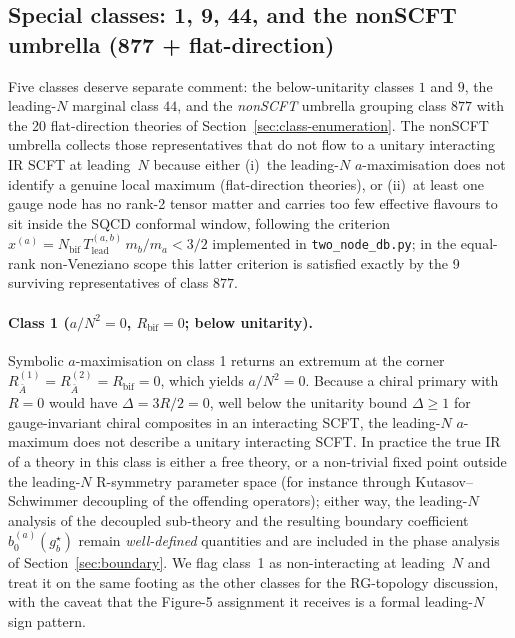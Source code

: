 \subsection{Special classes: 1, 9, 44, and the nonSCFT umbrella (877 + flat-direction)}
\label{sec:class-special}

Five classes deserve separate comment: the below-unitarity classes
$1$ and $9$, the leading-$N$ marginal class $44$, and the
\emph{nonSCFT} umbrella grouping class $877$ with the 20 flat-direction
theories of Section~\ref{sec:class-enumeration}.  The nonSCFT umbrella
collects those representatives that do not flow to a unitary
interacting IR SCFT at leading~$N$ because either (i)~the
leading-$N$ $a$-maximisation does not identify a genuine local
maximum (flat-direction theories), or (ii)~at least one gauge node
has no rank-2 tensor matter and carries too few effective flavours to
sit inside the SQCD conformal window, following the criterion
$x^{(a)}=N_{\text{bif}}\,T_{\text{lead}}^{(a,b)}\,m_{b}/m_{a}<3/2$
implemented in \texttt{two\_node\_db.py}; in the equal-rank
non-Veneziano scope this latter criterion is satisfied exactly by
the 9 surviving representatives of class $877$.

\paragraph{Class 1 ($a/N^{2}=0$, $R_{\text{bif}}=0$; below unitarity).}
Symbolic $a$-maximisation on class 1 returns an extremum at the
corner $R_{\bar A}^{(1)}=R_{\bar A}^{(2)}=R_{\text{bif}}=0$, which
yields $a/N^{2}=0$.  Because a chiral primary with $R=0$ would have
$\Delta=3R/2=0$, well below the unitarity bound $\Delta\ge 1$ for
gauge-invariant chiral composites in an interacting SCFT, the
leading-$N$ $a$-maximum does not describe a unitary interacting SCFT.
In practice the true IR of a theory in this class is either a free
theory, or a non-trivial fixed point outside the leading-$N$
R-symmetry parameter space (for instance through Kutasov–Schwimmer
decoupling of the offending operators); either way, the
leading-$N$ analysis of the decoupled sub-theory and the resulting
boundary coefficient $b_{0}^{(a)}(g_{b}^{\star})$ remain
\emph{well-defined} quantities and are included in the phase analysis
of Section~\ref{sec:boundary}.  We flag class~1 as non-interacting at
leading~$N$ and treat it on the same footing as the other classes for
the RG-topology discussion, with the caveat that the Figure-5
assignment it receives is a formal leading-$N$ sign pattern.

